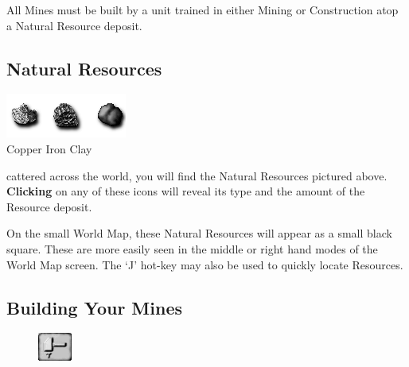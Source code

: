 All Mines must be built by a unit trained in either Mining or Construction atop a Natural Resource deposit. \\ %

\subsection{\textsf{Natural Resources}}



\begin{center}
\includegraphics[width=0.5\linewidth]{Iresources} %
\\ Copper Iron Clay
\end{center}

cattered across the world, you will find the Natural Resources pictured above. \textbf{Clicking} on any of these icons will reveal its type and the amount of the Resource deposit.


On the small World Map, these Natural Resources will appear as a small black square. These are more easily seen in the middle or right hand modes of the World Map screen. The ‘J’ hot-key may also be used to quickly locate Resources.

\subsection{\textsf{Building Your Mines}}


\begin{figure}
    \vspace{-20pt}
    \begin{center}
        \includegraphics[width=0.1\textwidth]{Thammer}
    \end{center}
    \vspace{-20pt}
\end{figure}

